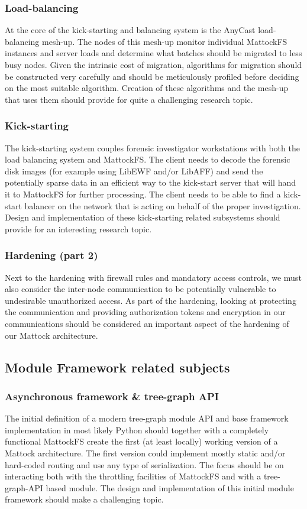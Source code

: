\subsubsection{Load-balancing}
At the core of the kick-starting and balancing system is the AnyCast load-balancing mesh-up. The nodes of this mesh-up monitor individual MattockFS instances and server loads and determine what batches should be migrated to less busy nodes. Given the intrinsic cost of migration, algorithms for migration should be constructed very carefully and should be meticulously profiled before deciding on the most suitable algorithm.  Creation of these algorithms and the mesh-up that uses them should provide for quite a challenging research topic.
\subsubsection{Kick-starting}
The kick-starting system couples forensic investigator workstations with both the load balancing system and MattockFS. The client needs to decode the forensic disk images (for example using LibEWF and/or LibAFF) and send the potentially sparse data in an efficient way to the kick-start server that will hand it to MattockFS for further processing. The client needs to be able to find a kick-start balancer on the network that is acting on behalf of the proper investigation. Design and implementation of these kick-starting related subsystems should provide for an interesting research topic.
\subsubsection{Hardening (part 2)}
Next to the hardening with firewall rules and mandatory access controls, we must also consider the inter-node communication to be potentially vulnerable to undesirable unauthorized access. As part of the hardening, looking at protecting the communication and providing authorization tokens and encryption in our communications should be considered an important aspect of the hardening of our Mattock architecture.
\subsection{Module Framework related subjects}
\subsubsection{Asynchronous framework \& tree-graph API}
The initial definition of a modern tree-graph module API and base framework implementation in most likely Python should together with a completely functional MattockFS create the first (at least locally) working version of a Mattock architecture. The first version could implement mostly static and/or hard-coded routing and use any type of serialization. The focus should be on interacting both with the throttling facilities of MattockFS and with a tree-graph-API based module. The design and implementation of this initial module framework should make a challenging topic.
